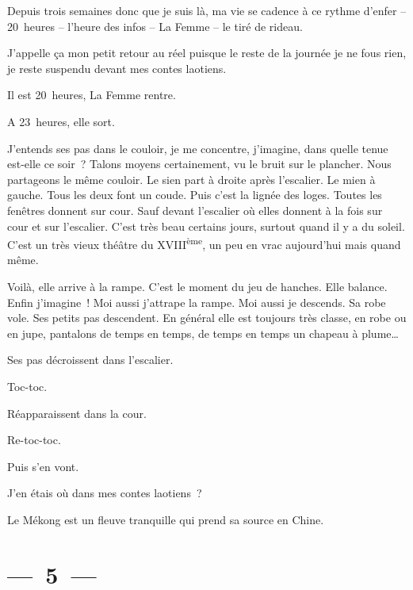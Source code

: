 \documentclass[french,twoside]{book} %
\begin{document}
\noindent Depuis trois semaines donc que je suis là, ma vie se cadence à ce rythme d’enfer – 20 heures – l’heure des infos – La Femme – le tiré de rideau.\par
J’appelle ça mon petit retour au réel puisque le reste de la journée je ne fous rien, je reste suspendu devant mes contes laotiens.\par
Il est 20 heures, La Femme rentre.\par
A 23 heures, elle sort.\par
J’entends ses pas dans le couloir, je me concentre, j’imagine, dans quelle tenue est-elle ce soir ? Talons moyens certainement, vu le bruit sur le plancher. Nous partageons le même couloir. Le sien part à droite après l’escalier. Le mien à gauche. Tous les deux font un coude. Puis c’est la lignée des loges. Toutes les fenêtres donnent sur cour. Sauf devant l’escalier où elles donnent à la fois sur cour et sur l’escalier. C’est très beau certains jours, surtout quand il y a du soleil. C’est un très vieux théâtre du XVIII\textsuperscript{ème}, un peu en vrac aujourd’hui mais quand même.\par
Voilà, elle arrive à la rampe. C’est le moment du jeu de hanches. Elle balance. Enfin j’imagine ! Moi aussi j’attrape la rampe. Moi aussi je descends. Sa robe vole. Ses petits pas descendent. En général elle est toujours très classe, en robe ou en jupe, pantalons de temps en temps, de temps en temps un chapeau à plume…\par
Ses pas décroissent dans l’escalier.\par
Toc-toc.\par
Réapparaissent dans la cour.\par
Re-toc-toc.\par
Puis s’en vont.\par
J’en étais où dans mes contes laotiens ?\par
Le Mékong est un fleuve tranquille qui prend sa source en Chine.

\section[{— 5 —}]{— 5 —}
\renewcommand{\leftmark}{— 5 —}
\end{document}
